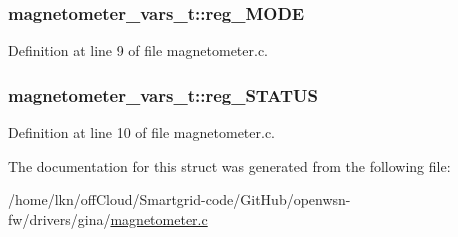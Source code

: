 \subsubsection[{\texorpdfstring{reg\+\_\+\+M\+O\+DE}{reg_MODE}}]{ magnetometer\+\_\+vars\+\_\+t\+::reg\+\_\+\+M\+O\+DE}\hypertarget{structmagnetometer__vars__t_a6a993689edf4263f64dc82a7f7a67a5f}{}\label{structmagnetometer__vars__t_a6a993689edf4263f64dc82a7f7a67a5f}


Definition at line 9 of file magnetometer.\+c.

\subsubsection[{\texorpdfstring{reg\+\_\+\+S\+T\+A\+T\+US}{reg_STATUS}}]{ magnetometer\+\_\+vars\+\_\+t\+::reg\+\_\+\+S\+T\+A\+T\+US}\hypertarget{structmagnetometer__vars__t_acd0a28f11cb00349d7eda64aa412c378}{}\label{structmagnetometer__vars__t_acd0a28f11cb00349d7eda64aa412c378}


Definition at line 10 of file magnetometer.\+c.



The documentation for this struct was generated from the following file\+:\begin{DoxyCompactItemize}
\item 
/home/lkn/off\+Cloud/\+Smartgrid-\/code/\+Git\+Hub/openwsn-\/fw/drivers/gina/\hyperlink{magnetometer_8c}{magnetometer.\+c}\end{DoxyCompactItemize}

